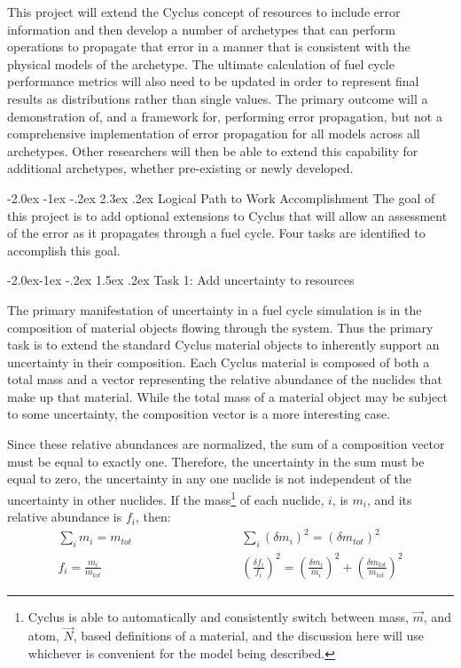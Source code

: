 \documentclass[dvips,12pt]{article}
\makeatletter
\newcommand{\unc}[1]
{ \delta #1 }
\newcommand{\uncsq}[1]
{ \left(\unc{#1}\right)^2 }
\newcommand{\uncratio}[1]
{ \left(\frac{\unc{#1}}{#1}\right) }
\newcommand{\uncratiosq}[1]
{ \uncratio{#1}^2 }
\renewcommand\section{\@startsection {section}{1}{\z@}%
                                   {-2.0ex \@plus -1ex \@minus -.2ex}%
                                   {2.3ex \@plus.2ex}%
                                   {\normalfont\bfseries}}%
\renewcommand\subsection{\@startsection{subsection}{2}{\z@}%
                                     {-2.0ex\@plus -1ex \@minus -.2ex}%
                                     {1.5ex \@plus .2ex}%
                                     {\normalfont\bfseries}}%
\makeatother
\begin{document}
This project
will extend the Cyclus concept of resources to
include error information and then develop a
number of archetypes that can perform operations
to propagate that error in a manner that is 
consistent with the physical models of the 
archetype.
The ultimate calculation of fuel cycle performance
metrics will also need to be updated in order to
represent final results as distributions rather
than single values.  The primary outcome will
a demonstration of, and a
framework for, performing error propagation,
but not a comprehensive implementation of error
propagation for all models across all archetypes.
Other researchers will then be able to extend
this capability for additional archetypes, 
whether pre-existing or newly developed.

\section{Logical Path to Work Accomplishment}
The goal of this project is to add optional
extensions to Cyclus that will allow an assessment
of the error as it propagates through a fuel
cycle.  Four tasks are identified to accomplish
this goal.


\subsection{Task 1: Add uncertainty to resources}

The primary manifestation of uncertainty in a fuel
cycle simulation is in the composition of material
objects flowing through the system.  Thus the
primary task is to extend the standard Cyclus
material objects to inherently support an
uncertainty in their composition.  Each Cyclus
material is composed of both a total mass and a
vector representing the relative abundance of the
nuclides that make up that material.  While the
total mass of a material object may be subject to
some uncertainty, the composition vector is a more
interesting case.

Since these relative abundances are normalized,
the sum of a composition vector must be equal to
exactly one. Therefore, the uncertainty in the sum
must be equal to zero, the uncertainty in any one
nuclide is not independent of the uncertainty in
other nuclides.  If the mass\footnote{Cyclus 
is able to automatically and consistently switch
between mass, $\vec{m}$, and atom, $\vec{N}$, based
 definitions of a
material, and the discussion here will use 
whichever is convenient for the model being 
described.}
 of each nuclide, $i$,
is $m_i$, and its relative abundance is $f_i$,
then:
\begin{align*}
  \sum_i m_i = m_{tot} \qquad\qquad&\qquad\qquad  
       \sum_i \uncsq{m_i} = \uncsq{m_{tot}}\\
  f_i = \frac{m_i}{m_{tot}} \qquad\qquad&\qquad\qquad  
       \uncratiosq{f_i} = \uncratiosq{m_i} + \uncratiosq{m_{tot}}
\end{align*}
\end{document}
